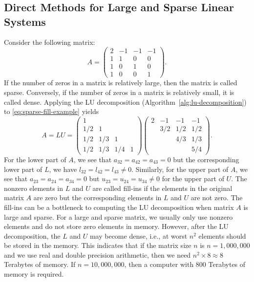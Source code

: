 \subsection{{Direct Methods for Large and Sparse Linear Systems}}\label{sec:sparse-direct-methods}
{Consider the following matrix:}
\begin{equation}\label{eq:sparse-fill-example}
A=\begin{pmatrix}2&-1&-1&-1\\1&1&0&0\\1&0&1&0\\1&0&0&1\end{pmatrix}.
\end{equation}
{If the number of zeros in a matrix is relatively large, then the matrix is called sparse. Conversely, if the number of zeros in a matrix is relatively small, it is called dense.}
{Applying the LU decomposition (Algorithm~\ref{alg:lu-decomposition}) to \eqref{eq:sparse-fill-example} yields}
\[
A=LU=
\begin{pmatrix}1&&&\\1/2&1&&\\1/2&1/3&1&\\1/2&1/3&1/4&1\end{pmatrix}
\begin{pmatrix}2&-1&-1&-1\\&3/2&1/2&1/2\\&&4/3&1/3\\&&&5/4\end{pmatrix}.
\]
{For the lower part of $A$, we see that $a_{32}=a_{42}=a_{43}=0$ but the corresponding lower part of $L$, we have $l_{32}=l_{42}=l_{43}\ne0$. Similarly, for the upper part of $A$, we see that $a_{23}=a_{24}=a_{34}=0$ but $u_{23}=u_{24}=u_{34}\ne0$ for the upper part of $U$. The nonzero elements in $L$ and $U$ are called fill-ins if the elements in the original matrix $A$ are zero but the corresponding elements in $L$ and $U$ are not zero.}
{The fill-ins can be a bottleneck to computing the LU decomposition when matrix $A$ is large and sparse. For a large and sparse matrix, we usually only use nonzero elements and do not store zero elements in memory. However, after the LU decomposition, the $L$ and $U$ may become dense, i.e., at worst $n^2$ elements should be stored in the memory. This indicates that if the matrix size $n$ is $n=1,000,000$ and we use real and double precision arithmetic, then we need $n^2\times8\approx8$ Terabytes of memory. If $n=10,000,000$, then a computer with 800 Terabytes of memory is required.}
